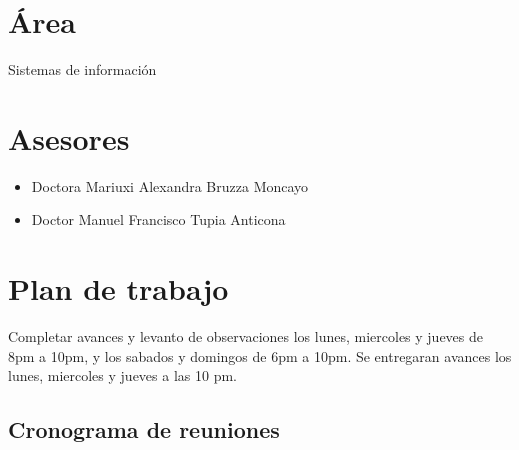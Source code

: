 \documentclass{article}
\begin{document}


\section{Área}
Sistemas de información

\section{Asesores}
\begin{itemize}
    \item{Doctora Mariuxi Alexandra Bruzza Moncayo}
    \item{Doctor Manuel Francisco Tupia Anticona}
\end{itemize}

\section{Plan de trabajo}

Completar avances y levanto de observaciones los lunes, miercoles y jueves de
8pm a 10pm, y los sabados y domingos de 6pm a 10pm.
Se entregaran avances los lunes, miercoles y jueves a las 10 pm.

\subsection{Cronograma de reuniones}
\end{document}
